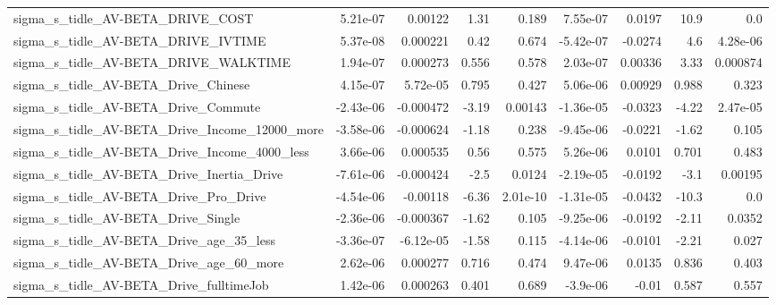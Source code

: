 \begin{tabular}{lrrrrrrrr}
sigma\_s\_tidle\_AV-BETA\_DRIVE\_COST                   &    5.21e-07 &      0.00122 &     1.31 &    0.189 &   7.55e-07 &      0.0197 &         10.9 &           0.0 \\
sigma\_s\_tidle\_AV-BETA\_DRIVE\_IVTIME                 &    5.37e-08 &     0.000221 &     0.42 &    0.674 &  -5.42e-07 &     -0.0274 &          4.6 &      4.28e-06 \\
sigma\_s\_tidle\_AV-BETA\_DRIVE\_WALKTIME               &    1.94e-07 &     0.000273 &    0.556 &    0.578 &   2.03e-07 &     0.00336 &         3.33 &      0.000874 \\
sigma\_s\_tidle\_AV-BETA\_Drive\_Chinese                &    4.15e-07 &     5.72e-05 &    0.795 &    0.427 &   5.06e-06 &     0.00929 &        0.988 &         0.323 \\
sigma\_s\_tidle\_AV-BETA\_Drive\_Commute                &   -2.43e-06 &    -0.000472 &    -3.19 &  0.00143 &  -1.36e-05 &     -0.0323 &        -4.22 &      2.47e-05 \\
sigma\_s\_tidle\_AV-BETA\_Drive\_Income\_12000\_more      &   -3.58e-06 &    -0.000624 &    -1.18 &    0.238 &  -9.45e-06 &     -0.0221 &        -1.62 &         0.105 \\
sigma\_s\_tidle\_AV-BETA\_Drive\_Income\_4000\_less       &    3.66e-06 &     0.000535 &     0.56 &    0.575 &   5.26e-06 &      0.0101 &        0.701 &         0.483 \\
sigma\_s\_tidle\_AV-BETA\_Drive\_Inertia\_Drive          &   -7.61e-06 &    -0.000424 &     -2.5 &   0.0124 &  -2.19e-05 &     -0.0192 &         -3.1 &       0.00195 \\
sigma\_s\_tidle\_AV-BETA\_Drive\_Pro\_Drive              &   -4.54e-06 &     -0.00118 &    -6.36 & 2.01e-10 &  -1.31e-05 &     -0.0432 &        -10.3 &           0.0 \\
sigma\_s\_tidle\_AV-BETA\_Drive\_Single                 &   -2.36e-06 &    -0.000367 &    -1.62 &    0.105 &  -9.25e-06 &     -0.0192 &        -2.11 &        0.0352 \\
sigma\_s\_tidle\_AV-BETA\_Drive\_age\_35\_less            &   -3.36e-07 &    -6.12e-05 &    -1.58 &    0.115 &  -4.14e-06 &     -0.0101 &        -2.21 &         0.027 \\
sigma\_s\_tidle\_AV-BETA\_Drive\_age\_60\_more            &    2.62e-06 &     0.000277 &    0.716 &    0.474 &   9.47e-06 &      0.0135 &        0.836 &         0.403 \\
sigma\_s\_tidle\_AV-BETA\_Drive\_fulltimeJob            &    1.42e-06 &     0.000263 &    0.401 &    0.689 &   -3.9e-06 &       -0.01 &        0.587 &         0.557 \\

\end{tabular}
